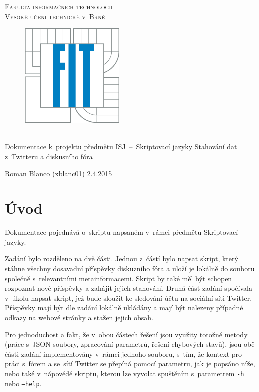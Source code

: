 \documentclass[11pt,a4paper]{article}
\begin{document}
  \begin{titlepage}
    \begin{center}
      \Huge
      \textsc{Fakulta informačních technologií\\ Vysoké učení technické v~Brně}
      \vspace{100px}
      \begin{figure}[!h]
        \centering
        \includegraphics[height=5cm]{logo.jpg}
      \end{figure}
      \\[50mm]
      \LARGE{Dokumentace k~projektu předmětu ISJ \,--\, Skriptovací jazyky
             \newline
             Stahování dat z~Twitteru a diskusního fóra}
      \vfill
    \end{center}
    \Large{Roman Blanco (xblanc01) \hfill 2.4.2015}
  \end{titlepage}

  \tableofcontents
  \newpage

  \section{Úvod}

    Dokumentace pojednává o~skriptu napsaném v~rámci předmětu Skriptovací
    jazyky.

    Zadání bylo rozděleno na dvě části. Jednou z~částí bylo napsat skript,
    který stáhne všechny dosavadní příspěvky diskuzního fóra a uloží je lokálně
    do souboru společně s~relevantními metainformacemi. Skript by také měl být
    schopen rozpoznat nové příspěvky a zahájit jejich stahování.
    Druhá část zadání spočívala v~úkolu napsat skript, jež bude sloužit ke
    sledování účtu na sociální síti Twitter. Příspěvky mají být dle zadání
    lokálně ukládány a mají být nalezeny případné odkazy na webové stránky a
    stažen jejich obsah.

    Pro jednoduchost a fakt, že v~obou částech řešení jsou využity totožné
    metody (práce s~JSON soubory, zpracování parametrů, řešení chybových
    stavů), jsou obě části zadání implementovány v~rámci jednoho souboru,
    s~tím, že kontext pro práci s~fórem a se~sítí Twitter se přepíná pomocí
    parametru, jak je popsáno níže, nebo také v~nápovědě skriptu, kterou lze
    vyvolat spuštěním s~parametrem \texttt{-h} nebo \texttt{--help}.
\end{document}
